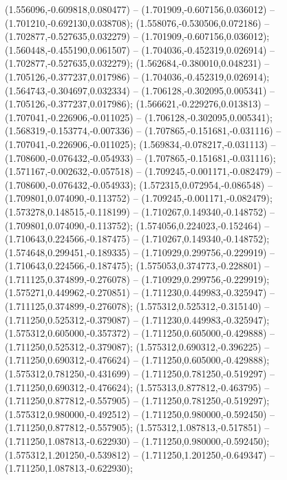  (1.556096,-0.609818,0.080477) -- (1.701909,-0.607156,0.036012) -- (1.701210,-0.692130,0.038708);
 (1.558076,-0.530506,0.072186) -- (1.702877,-0.527635,0.032279) -- (1.701909,-0.607156,0.036012);
 (1.560448,-0.455190,0.061507) -- (1.704036,-0.452319,0.026914) -- (1.702877,-0.527635,0.032279);
 (1.562684,-0.380010,0.048231) -- (1.705126,-0.377237,0.017986) -- (1.704036,-0.452319,0.026914);
 (1.564743,-0.304697,0.032334) -- (1.706128,-0.302095,0.005341) -- (1.705126,-0.377237,0.017986);
 (1.566621,-0.229276,0.013813) -- (1.707041,-0.226906,-0.011025) -- (1.706128,-0.302095,0.005341);
 (1.568319,-0.153774,-0.007336) -- (1.707865,-0.151681,-0.031116) -- (1.707041,-0.226906,-0.011025);
 (1.569834,-0.078217,-0.031113) -- (1.708600,-0.076432,-0.054933) -- (1.707865,-0.151681,-0.031116);
 (1.571167,-0.002632,-0.057518) -- (1.709245,-0.001171,-0.082479) -- (1.708600,-0.076432,-0.054933);
 (1.572315,0.072954,-0.086548) -- (1.709801,0.074090,-0.113752) -- (1.709245,-0.001171,-0.082479);
 (1.573278,0.148515,-0.118199) -- (1.710267,0.149340,-0.148752) -- (1.709801,0.074090,-0.113752);
 (1.574056,0.224023,-0.152464) -- (1.710643,0.224566,-0.187475) -- (1.710267,0.149340,-0.148752);
 (1.574648,0.299451,-0.189335) -- (1.710929,0.299756,-0.229919) -- (1.710643,0.224566,-0.187475);
 (1.575053,0.374773,-0.228801) -- (1.711125,0.374899,-0.276078) -- (1.710929,0.299756,-0.229919);
 (1.575271,0.449962,-0.270851) -- (1.711230,0.449983,-0.325947) -- (1.711125,0.374899,-0.276078);
 (1.575312,0.525312,-0.315140) -- (1.711250,0.525312,-0.379087) -- (1.711230,0.449983,-0.325947);
 (1.575312,0.605000,-0.357372) -- (1.711250,0.605000,-0.429888) -- (1.711250,0.525312,-0.379087);
 (1.575312,0.690312,-0.396225) -- (1.711250,0.690312,-0.476624) -- (1.711250,0.605000,-0.429888);
 (1.575312,0.781250,-0.431699) -- (1.711250,0.781250,-0.519297) -- (1.711250,0.690312,-0.476624);
 (1.575313,0.877812,-0.463795) -- (1.711250,0.877812,-0.557905) -- (1.711250,0.781250,-0.519297);
 (1.575312,0.980000,-0.492512) -- (1.711250,0.980000,-0.592450) -- (1.711250,0.877812,-0.557905);
 (1.575312,1.087813,-0.517851) -- (1.711250,1.087813,-0.622930) -- (1.711250,0.980000,-0.592450);
 (1.575312,1.201250,-0.539812) -- (1.711250,1.201250,-0.649347) -- (1.711250,1.087813,-0.622930);
